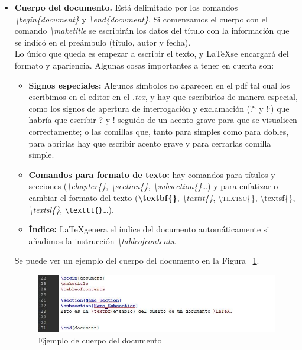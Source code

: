 \documentclass[a4paper, 12pt]{book}
\begin{document}
\begin{itemize}
	\item \textbf{Cuerpo del documento.} Está delimitado por los comandos \textit{\textbackslash begin\{document\}} y \textit{\textbackslash end\{document\}}. Si comenzamos el cuerpo con el comando \textit{\textbackslash maketitle} se escribirán los datos del título con la información que se indicó en el preámbulo (título, autor y fecha).\\
	Lo único que queda es empezar a escribir el texto, y \LaTeX se encargará del formato y apariencia. Algunas cosas importantes a tener en cuenta son: 
	\begin{itemize}
		\item \textbf{Signos especiales:} Algunos símbolos no aparecen en el pdf tal cual los escribimos en el editor en el \textit{.tex}, y hay que escribirlos de manera especial, como los signos de apertura de interrogación y exclamación (?` y !`) que habría que escribir ? y ! seguido de un acento grave para que se visualicen correctamente; o las comillas que, tanto para simples como para dobles, para abrirlas hay que escribir acento grave y para cerrarlas comilla simple.
		\item \textbf{Comandos para formato de texto:} hay comandos para títulos y secciones (\mbox{\textit{\textbackslash chapter\{\}}}, \textit{\textbackslash section\{\}}, \textit{\textbackslash subsection\{\}}\ldots) y para enfatizar o cambiar el formato del texto (\textbf{\textbackslash textbf\{\}}, \textit{\textbackslash textit\{\}}, \textsc{\textbackslash textsc\{\}}, \textsf{\textbackslash textsf\{\}}, \textsl{\textbackslash textsl\{\}}, \texttt{\textbackslash texttt\{\}}\ldots).
		\item \textbf{Índice:} \LaTeX genera el índice del documento automáticamente si añadimos la instrucción \textit{\textbackslash tableofcontents}.
	\end{itemize}
	
Se puede ver un ejemplo del cuerpo del documento en la Figura ~\ref{fig:cuerpo}.	
	
\begin{figure}[h!]
	\centering
	\includegraphics[width=13cm, keepaspectratio]{img/cuerpo_latex}
	\caption{Ejemplo de cuerpo del documento}
	\label{fig:cuerpo}
\end{figure}
	
\end{itemize}
\end{document}
